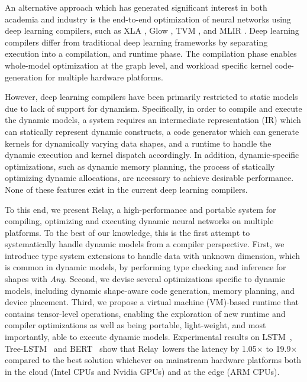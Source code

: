 An alternative approach which has generated significant interest in both academia and industry is the end-to-end optimization of neural networks using deep learning compilers, such as XLA \citep{xla}, Glow \citep{glow}, TVM \citep{tvm_osdi18}, and MLIR \citep{lattner2020mlir}.
Deep learning compilers differ from traditional deep learning frameworks by separating execution into a compilation, and runtime phase. The compilation phase enables whole-model optimization at the graph level, and workload specific kernel code-generation for multiple hardware platforms.

However, deep learning compilers have been primarily restricted to static models due to lack of support for dynamism.
Specifically, in order to compile and execute the dynamic models, a system requires an intermediate representation (IR) which can statically represent dynamic constructs, a code generator
which can generate kernels for dynamically varying data shapes, and a runtime to handle the dynamic execution and kernel dispatch accordingly.
In addition, dynamic-specific optimizations, such as dynamic memory planning, the process of statically optimizing dynamic allocations, are necessary to achieve desirable performance.
None of these features exist in the current deep learning compilers.

To this end, we present Relay, a high-performance and portable system for compiling, optimizing and executing dynamic neural networks on multiple platforms.
To the best of our knowledge, this is the first attempt to systematically handle dynamic models from a compiler perspective.
First, we introduce type system extensions to handle data with unknown dimension, which is common in dynamic models, by performing type checking and inference for shapes with {\em Any}.
Second, we devise several optimizations specific to dynamic models, including dynamic shape-aware code generation, memory planning, and device placement.
Third, we propose a virtual machine (VM)-based runtime that contains tensor-level operations, enabling the exploration of new runtime and compiler optimizations as well as
being portable, light-weight, and most importantly, able to execute dynamic models.
Experimental results on LSTM~\citep{lstm}, Tree-LSTM~\citep{tree_lstm} and BERT~\citep{devlin2018bert} show that Relay~lowers the latency by 1.05$\times$ to 19.9$\times$ compared to the best solution whichever on mainstream hardware platforms both in the cloud (Intel CPUs and Nvidia GPUs) and at the edge (ARM CPUs).

